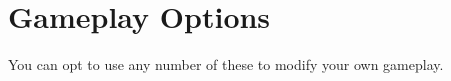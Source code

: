 \documentclass[letterpaper,twocolumn,openany,nodeprecatedcode]{dndbook}
\begin{document}
%
%
%






\chapter{Gameplay Options}
\noindent You can opt to use any number of these to modify your own gameplay.
\end{document}
